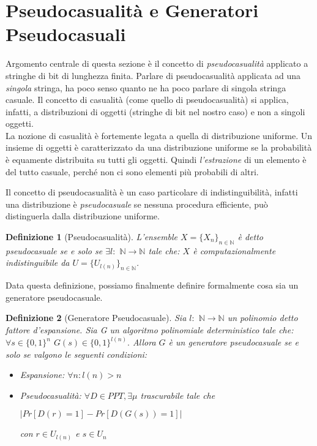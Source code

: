\documentclass[a4paper,openright,twoside,12pt]{report}
\newtheorem{definizione}{Definizione}[chapter]
\begin{document}
\section{Pseudocasualit\`a e Generatori Pseudocasuali}
Argomento centrale di questa sezione \`e il concetto di \emph{pseudocasualit\`a} applicato a stringhe di bit di lunghezza finita.
Parlare di pseudocasualit\`a applicata ad una \emph{singola} stringa, ha poco senso quanto ne ha poco parlare di singola stringa casuale.
Il concetto di casualit\`a (come quello di pseudocasualit\`a) si applica, infatti, a distribuzioni di oggetti (stringhe di bit nel nostro caso) e non a singoli oggetti.\\
La nozione di casualit\`a \`e fortemente legata a quella di distribuzione uniforme. Un insieme di oggetti \`e caratterizzato
da una distribuzione uniforme se la probabilit\`a \`e equamente distribuita su tutti gli oggetti. Quindi \emph{l'estrazione} di un elemento \`e del tutto casuale, 
perch\'e non ci sono elementi pi\`u probabili di altri.

Il concetto di pseudocasualit\`a \`e un caso particolare di indistinguibilit\`a, infatti una distribuzione \`e \emph{pseudocasuale} se nessuna procedura efficiente, 
pu\`o distinguerla dalla distribuzione uniforme.
\begin{definizione}[Pseudocasualit\`a]
L'ensemble $X=\{X_n\}_{n \in \mathbb{N}}$ \`e detto pseudocasuale se e solo se $ \exists l:$ $\mathbb{N}\rightarrow\mathbb{N}$ tale che: 
$X$ \`e computazionalmente indistinguibile da $U=\{U_{l(n)}\}_{n \in \mathbb{N}} $.  
\end{definizione}
Data questa definizione, possiamo finalmente definire formalmente cosa sia un generatore pseudocasuale.
\begin{definizione}[Generatore Pseudocasuale]
Sia $l:$ $\mathbb{N}\rightarrow\mathbb{N}$ un polinomio detto fattore d'espansione. 
Sia G un algoritmo polinomiale deterministico tale che: $\forall s \in \{0, 1\}^{n}$ $G(s) \in \{0, 1\}^{l(n)}.$
Allora $G$ \`e un generatore pseudocasuale se e solo se valgono le seguenti condizioni:
\begin{itemize}
 \item Espansione: $\forall n: l(n) > n$
 \item Pseudocasualit\`a: $\forall D \in PPT, \exists \mu$ trascurabile tale che \begin{center}
                                                   $\lvert Pr[D(r) = 1] - Pr[D(G(s)) = 1]\rvert$                               
                                                                                 \end{center} 
con $r \in U_{l(n)}$ e $s \in U_{n}$
\end{itemize}
\end{definizione}
\end{document}
